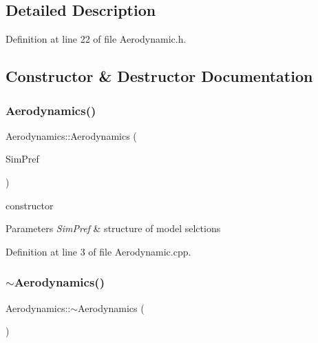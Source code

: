 \subsection{Detailed Description}


Definition at line 22 of file Aerodynamic.\+h.



\subsection{Constructor \& Destructor Documentation}
\mbox{\label{class_aerodynamics_af0582a3e010d9614ace4b96f31fc2a8d}} 
\subsubsection{\texorpdfstring{Aerodynamics()}{Aerodynamics()}}
{\footnotesize\ttfamily Aerodynamics\+::\+Aerodynamics (\begin{DoxyParamCaption}\item[{Sim\+D\+Preference \&}]{Sim\+Pref }\end{DoxyParamCaption})}



constructor 


\begin{DoxyParams}{Parameters}
{\em Sim\+Pref} & structure of model selctions \\
\hline
\end{DoxyParams}


Definition at line 3 of file Aerodynamic.\+cpp.

\mbox{\label{class_aerodynamics_af0e048e0c80ec8334997b79b761fea60}} 
\subsubsection{\texorpdfstring{$\sim$\+Aerodynamics()}{~Aerodynamics()}}
{\footnotesize\ttfamily Aerodynamics\+::$\sim$\+Aerodynamics (\begin{DoxyParamCaption}{ }\end{DoxyParamCaption})}



